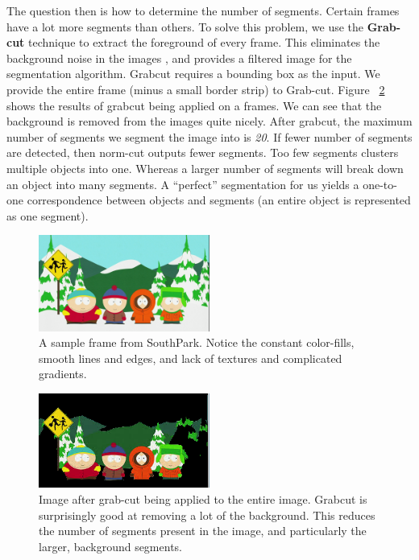 \documentclass[10pt,twocolumn,letterpaper]{article}
\begin{document}
The question then is how to determine the number of segments. Certain
frames have a lot more segments than others. To solve this problem, we
use the \textbf{Grab-cut} technique to extract the foreground of every
frame. This eliminates the background noise in the images , and
provides a filtered image for the segmentation algorithm. Grabcut
requires a bounding box as the input. We provide the entire frame
(minus a small border strip) to Grab-cut. Figure ~\ref{grabcut} shows
the results of grabcut being applied on a frames. We can see that
the background is removed from the images quite nicely. After grabcut,
the maximum number of segments we segment the image into is
\emph{20}. If fewer number of segments are detected, then norm-cut
outputs fewer segments. Too few segments clusters multiple objects
into one. Whereas a larger number of segments will break down an
object into many segments. A ``perfect'' segmentation for us yields a
one-to-one correspondence between objects and segments (an entire
object is represented as one segment). 

\begin{figure}[H]
  \centering
  \includegraphics[width=0.5\textwidth]{../results/southpark.png}
  \caption{A sample frame from SouthPark. Notice the constant
    color-fills, smooth lines and edges, and lack of textures and
    complicated gradients. }
  \label{orig-image}
\end{figure}


\begin{figure}[H]
  \centering
  \includegraphics[width=0.5\textwidth]{../results/grabcut_full.png}
  \caption{Image after grab-cut being applied to the entire
    image. Grabcut is surprisingly good at removing a lot of the
    background. This reduces the number of segments present in the
    image, and particularly the larger, background segments.  }
  \label{grabcut}
\end{figure}
\end{document}
